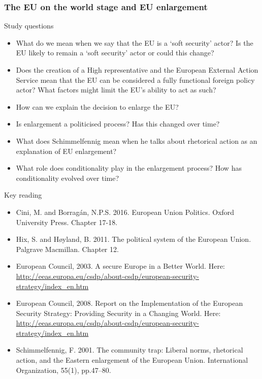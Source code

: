 \subsubsection*{The EU on the world stage and EU enlargement}

Study questions

\begin{itemize}
	\item What do we mean when we say that the EU is a `soft security' actor? Is the EU likely to remain a `soft security' actor or could this change?
	\item Does the creation of a High representative and the European External Action Service mean that the EU can be considered a fully functional foreign policy actor? What factors might limit the EU's ability to act as such?
	\item How can we explain the decision to enlarge the EU?
	\item Is enlargement a politicised process? Has this changed over time? 
	\item What does Schimmelfennig mean when he talks about rhetorical action as an explanation of EU enlargement?
	\item What role does conditionality play in the enlargement process? How has conditionality evolved over time?
\end{itemize}

\noindent Key reading

\begin{itemize}
	\item Cini, M. and Borragán, N.P.S. 2016. European Union Politics. Oxford University Press. Chapter 17-18.
	\item Hix, S. and H\o yland, B. 2011. The political system of the European Union. Palgrave Macmillan. Chapter 12.
	\item European Council, 2003. A secure Europe in a Better World. Here:	\url{http://eeas.europa.eu/csdp/about-csdp/european-security-strategy/index_en.htm}
	\item European Council, 2008. Report on the Implementation of the European Security Strategy: Providing Security in a Changing World. Here:	\url{http://eeas.europa.eu/csdp/about-csdp/european-security-strategy/index_en.htm}
	\item Schimmelfennig, F. 2001. The community trap: Liberal norms, rhetorical action, and the Eastern enlargement of the European Union. International Organization, 55(1), pp.47–80.
\end{itemize}


